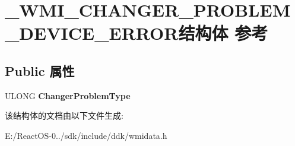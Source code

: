 \hypertarget{struct___w_m_i___c_h_a_n_g_e_r___p_r_o_b_l_e_m___d_e_v_i_c_e___e_r_r_o_r}{}\section{\+\_\+\+W\+M\+I\+\_\+\+C\+H\+A\+N\+G\+E\+R\+\_\+\+P\+R\+O\+B\+L\+E\+M\+\_\+\+D\+E\+V\+I\+C\+E\+\_\+\+E\+R\+R\+O\+R结构体 参考}
\label{struct___w_m_i___c_h_a_n_g_e_r___p_r_o_b_l_e_m___d_e_v_i_c_e___e_r_r_o_r}
\subsection*{Public 属性}
\begin{DoxyCompactItemize}
\item 
\mbox{\label{struct___w_m_i___c_h_a_n_g_e_r___p_r_o_b_l_e_m___d_e_v_i_c_e___e_r_r_o_r_aa7b3598c67191f8abf37c0c83125c30a}} 
U\+L\+O\+NG {\bfseries Changer\+Problem\+Type}
\end{DoxyCompactItemize}


该结构体的文档由以下文件生成\+:\begin{DoxyCompactItemize}
\item 
E\+:/\+React\+O\+S-\/0../sdk/include/ddk/wmidata.\+h\end{DoxyCompactItemize}
